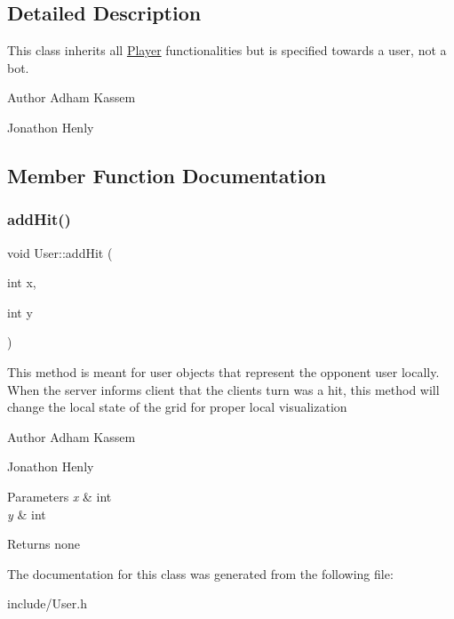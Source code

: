 \subsection{Detailed Description}
This class inherits all \hyperlink{classPlayer}{Player} functionalities but is specified towards a user, not a bot. \begin{DoxyAuthor}{Author}
Adham Kassem 

Jonathon Henly 
\end{DoxyAuthor}


\subsection{Member Function Documentation}
\mbox{\label{classUser_acc17e3c44688c5f9f00f0a297ac4b7dc}} 
\subsubsection{\texorpdfstring{add\+Hit()}{addHit()}}
{\footnotesize\ttfamily void User\+::add\+Hit (\begin{DoxyParamCaption}\item[{int}]{x,  }\item[{int}]{y }\end{DoxyParamCaption})\hspace{0.3cm}{\ttfamily [inline]}}

This method is meant for user objects that represent the opponent user locally. When the server informs client that the clients turn was a hit, this method will change the local state of the grid for proper local visualization \begin{DoxyAuthor}{Author}
Adham Kassem 

Jonathon Henly 
\end{DoxyAuthor}

\begin{DoxyParams}{Parameters}
{\em x} & int \\
\hline
{\em y} & int \\
\hline
\end{DoxyParams}
\begin{DoxyReturn}{Returns}
none 
\end{DoxyReturn}


The documentation for this class was generated from the following file\+:\begin{DoxyCompactItemize}
\item 
include/User.\+h\end{DoxyCompactItemize}

